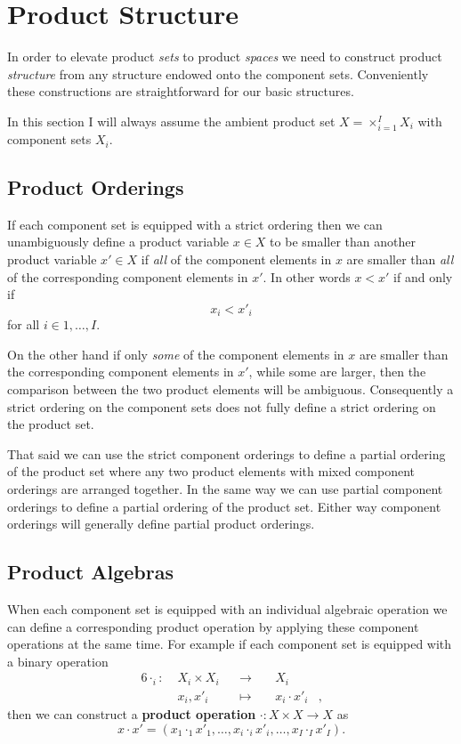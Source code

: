 \documentclass[
  letterpaper,
  DIV=11,
  numbers=noendperiod]{scrartcl}
\begin{document}
\hypertarget{product-structure}{%
\section{Product Structure}\label{product-structure}}

In order to elevate product \emph{sets} to product \emph{spaces} we need
to construct product \emph{structure} from any structure endowed onto
the component sets. Conveniently these constructions are straightforward
for our basic structures.

In this section I will always assume the ambient product set
\(X = \times_{i = 1}^{I} X_{i}\) with component sets \(X_{i}\).

\hypertarget{product-orderings}{%
\subsection{Product Orderings}\label{product-orderings}}

If each component set is equipped with a strict ordering then we can
unambiguously define a product variable \(x \in X\) to be smaller than
another product variable \(x' \in X\) if \emph{all} of the component
elements in \(x\) are smaller than \emph{all} of the corresponding
component elements in \(x'\). In other words \(x < x'\) if and only if
\[
x_{i} < x'_{i}
\] for all \(i \in {1, \ldots, I}\).

On the other hand if only \emph{some} of the component elements in \(x\)
are smaller than the corresponding component elements in \(x'\), while
some are larger, then the comparison between the two product elements
will be ambiguous. Consequently a strict ordering on the component sets
does not fully define a strict ordering on the product set.

That said we can use the strict component orderings to define a partial
ordering of the product set where any two product elements with mixed
component orderings are arranged together. In the same way we can use
partial component orderings to define a partial ordering of the product
set. Either way component orderings will generally define partial
product orderings.

\hypertarget{product-algebras}{%
\subsection{Product Algebras}\label{product-algebras}}

When each component set is equipped with an individual algebraic
operation we can define a corresponding product operation by applying
these component operations at the same time. For example if each
component set is equipped with a binary operation \begin{alignat*}{6}
\cdot_{i} :\; & X_{i} \times X_{i}& &\rightarrow& \; & X_{i} &
\\
& x_{i}, x'_{i} & &\mapsto& & x_{i} \cdot x'_{i} &,
\end{alignat*} then we can construct a \textbf{product operation}
\(\cdot : X \times X \rightarrow X\) as \[
x \cdot x' =
( x_{1} \cdot_{1} x'_{1}, \ldots,
  x_{i} \cdot_{i} x'_{i}, \ldots,
  x_{I} \cdot_{I} x'_{I} ).
\]
\end{document}
